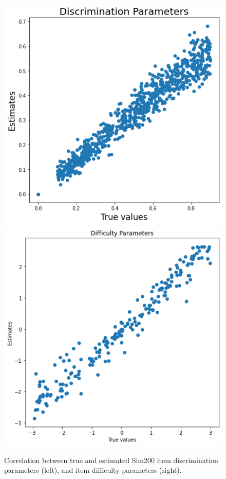 \begin{figure}[h]
  \centering
  \includegraphics[width=.85\textwidth]{img/kt_irt/disc_est_attn2.png}
  \endminipage
  \includegraphics[width=.85\textwidth]{img/kt_irt/diff_attn_sim200.png}
  \endminipage
  \caption{Correlation between true and estimated Sim200 item discrimination parameters (left), and item difficulty parameters (right).}
  \label{fig:disc_diff_sim200}
\end{figure}

